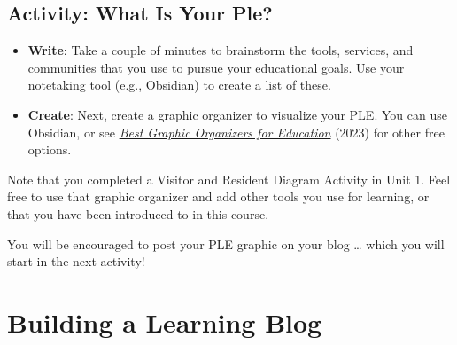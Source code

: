 \documentclass[
  letterpaper,
  DIV=11,
  numbers=noendperiod]{scrreprt}
\begin{document}
\subsection{Activity: What Is Your
Ple?}\label{activity-what-is-your-ple}

\begin{tcolorbox}[enhanced jigsaw, toprule=.15mm, colback=white, colframe=quarto-callout-note-color-frame, bottomtitle=1mm, leftrule=.75mm, coltitle=black, titlerule=0mm, rightrule=.15mm, colbacktitle=quarto-callout-note-color!10!white, left=2mm, title={Learning Activity}, opacitybacktitle=0.6, opacityback=0, breakable, toptitle=1mm, arc=.35mm, bottomrule=.15mm]

\begin{itemize}
\item
  \textbf{Write}: Take a couple of minutes to brainstorm the tools,
  services, and communities that you use to pursue your educational
  goals. Use your notetaking tool (e.g., Obsidian) to create a list of
  these.
\item
  \textbf{Create}: Next, create a graphic organizer to visualize your
  PLE. You can use Obsidian, or see
  \href{https://www.techlearning.com/news/best-graphic-organizers-for-education}{\emph{Best
  Graphic Organizers for Education}} (2023) for other free options.
\end{itemize}

\begin{tcolorbox}[enhanced jigsaw, toprule=.15mm, colback=white, colframe=quarto-callout-note-color-frame, arc=.35mm, opacityback=0, breakable, rightrule=.15mm, bottomrule=.15mm, leftrule=.75mm, left=2mm]

Note that you completed a Visitor and Resident Diagram Activity in Unit
1. Feel free to use that graphic organizer and add other tools you use
for learning, or that you have been introduced to in this course.

You will be encouraged to post your PLE graphic on your blog \ldots{}
which you will start in the next activity!

\end{tcolorbox}

\end{tcolorbox}

\section{Building a Learning Blog}\label{building-a-learning-blog}
\end{document}
